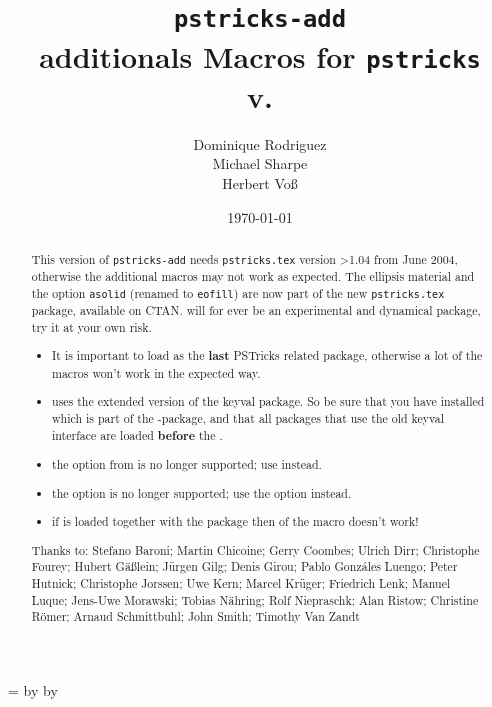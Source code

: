\documentclass[11pt,english,BCOR=10mm,DIV=12,bibliography=totoc,parskip=false,headings=small,
    headinclude=false,footinclude=false,oneside]{pst-doc}
\begin{document}
\title{\texttt{pstricks-add}\\additionals Macros for \texttt{pstricks}\\
    \small v.\pstricksaddFV}
\author{Dominique Rodriguez\\Michael Sharpe\\Herbert Voß}
\date{\today}

\settitle

\fullWidth=\linewidth
\advance\fullWidth by \marginparsep
\advance\fullWidth by \marginparwidth


\begin{abstract}
This version of \verb+pstricks-add+ needs \verb+pstricks.tex+
version >1.04 from June 2004, otherwise the additional macros may
not work as expected. The ellipsis material and the option
\verb+asolid+ (renamed to \verb+eofill+) are
 now part of the new
\verb+pstricks.tex+ package, available on CTAN.  will for ever be
an experimental and dynamical package, try it at your own risk.

\begin{itemize}
\item It is important to load  as the \textbf{last} PSTricks related package, otherwise
a lot of the macros won't work in the expected way.
\item {} uses the extended version of the keyval package. So be sure that
you have installed  which is part of the
-package, and that all packages that use the old
keyval interface are loaded \textbf{before} the
.
\item the option  from  is no longer supported; use  instead.
\item the option  is no longer supported; use the option  instead.
\item if  is loaded together with the package   then  
    of the  macro doesn't work!
\end{itemize}

\vfill
\noindent
Thanks to:  
Stefano Baroni;
Martin Chicoine;
Gerry Coombes;
Ulrich Dirr;
Christophe Fourey;
Hubert G\"a\ss lein;
J\"urgen Gilg;
Denis Girou;
Pablo Gonzáles Luengo;
Peter Hutnick;
Christophe Jorssen;
Uwe Kern;
Marcel Krüger;
Friedrich Lenk;
Manuel Luque;
Jens-Uwe Morawski;
Tobias N\"ahring;
Rolf Niepraschk;
Alan Ristow;
Christine R\"omer;
Arnaud Schmittbuhl;
John Smith;
Timothy Van Zandt
\end{abstract}
\end{document}
